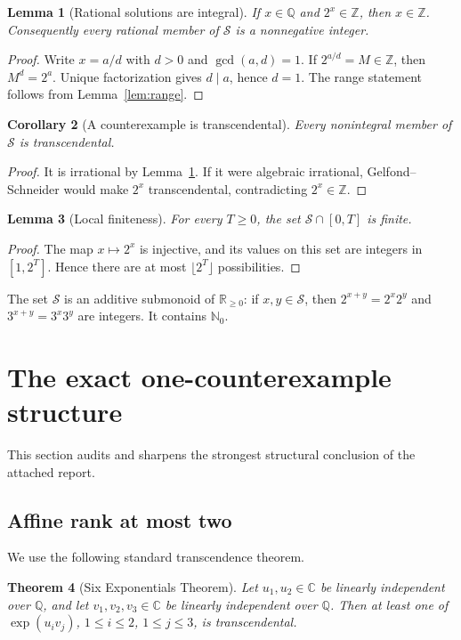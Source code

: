 \documentclass[11pt]{article}
\newtheorem{theorem}{Theorem}[section]
\newtheorem{lemma}[theorem]{Lemma}
\newtheorem{corollary}[theorem]{Corollary}
\theoremstyle{definition}
\newcommand{\Nzero}{\mathbb N_0}
\newcommand{\Z}{\mathbb Z}
\newcommand{\Q}{\mathbb Q}
\newcommand{\R}{\mathbb R}
\newcommand{\C}{\mathbb C}
\begin{document}
\begin{lemma}[Rational solutions are integral]\label{lem:rational}
If $x\in\Q$ and $2^x\in\Z$, then $x\in\Z$.  Consequently every rational member
of $\mathcal S$ is a nonnegative integer.
\end{lemma}
\begin{proof}
Write $x=a/d$ with $d>0$ and $\gcd(a,d)=1$.  If $2^{a/d}=M\in\Z$, then
$M^d=2^a$.  Unique factorization gives $d\mid a$, hence $d=1$.  The range
statement follows from Lemma~\ref{lem:range}.
\end{proof}

\begin{corollary}[A counterexample is transcendental]\label{cor:transcendental}
Every nonintegral member of $\mathcal S$ is transcendental.
\end{corollary}
\begin{proof}
It is irrational by Lemma~\ref{lem:rational}.  If it were algebraic irrational,
Gelfond--Schneider would make $2^x$ transcendental, contradicting
$2^x\in\Z$.
\end{proof}

\begin{lemma}[Local finiteness]\label{lem:local-finite}
For every $T\ge0$, the set $\mathcal S\cap[0,T]$ is finite.
\end{lemma}
\begin{proof}
The map $x\mapsto2^x$ is injective, and its values on this set are integers in
$[1,2^T]$.  Hence there are at most $\lfloor2^T\rfloor$ possibilities.
\end{proof}

The set $\mathcal S$ is an additive submonoid of $\R_{\ge0}$: if $x,y\in
\mathcal S$, then $2^{x+y}=2^x2^y$ and $3^{x+y}=3^x3^y$ are integers.  It
contains $\Nzero$.

\section{The exact one-counterexample structure}

This section audits and sharpens the strongest structural conclusion of the
attached report.

\subsection{Affine rank at most two}

We use the following standard transcendence theorem.

\begin{theorem}[Six Exponentials Theorem]\label{thm:six-exp}
Let $u_1,u_2\in\C$ be linearly independent over $\Q$, and let
$v_1,v_2,v_3\in\C$ be linearly independent over $\Q$.  Then at least one of
$\exp(u_i v_j)$, $1\le i\le2$, $1\le j\le3$, is transcendental.
\end{theorem}
\end{document}
